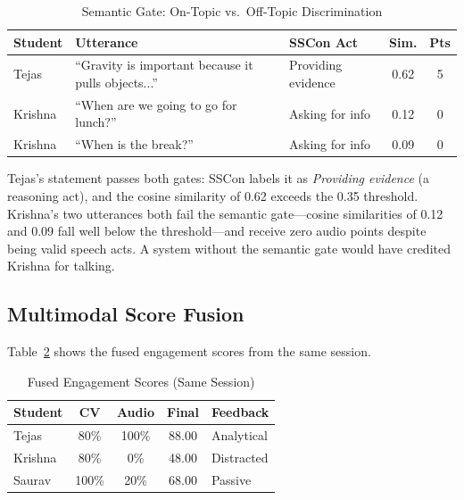 \documentclass[conference]{IEEEtran}
\begin{document}
\begin{table}[htbp]
\caption{Semantic Gate: On-Topic vs.\ Off-Topic Discrimination}
\begin{center}
\begin{tabular}{|p{0.9cm}|p{2.1cm}|p{1.5cm}|c|c|}
\hline
\textbf{Student} & \textbf{Utterance} & \textbf{SSCon Act} & \textbf{Sim.} & \textbf{Pts} \\
\hline
Tejas & ``Gravity is important because it pulls objects...'' & Providing evidence & 0.62 & 5 \\
\hline
Krishna & ``When are we going to go for lunch?'' & Asking for info & 0.12 & 0 \\
\hline
Krishna & ``When is the break?'' & Asking for info & 0.09 & 0 \\
\hline
\end{tabular}
\label{tab:gate_demo}
\end{center}
\end{table}

Tejas's statement passes both gates: SSCon labels it as \emph{Providing evidence} (a reasoning act), and the cosine similarity of 0.62 exceeds the 0.35 threshold. Krishna's two utterances both fail the semantic gate---cosine similarities of 0.12 and 0.09 fall well below the threshold---and receive zero audio points despite being valid speech acts. A system without the semantic gate would have credited Krishna for talking.

\subsection{Multimodal Score Fusion}
Table~\ref{tab:fused} shows the fused engagement scores from the same session.

\begin{table}[htbp]
\caption{Fused Engagement Scores (Same Session)}
\begin{center}
\begin{tabular}{|l|c|c|c|l|}
\hline
\textbf{Student} & \textbf{CV} & \textbf{Audio} & \textbf{Final} & \textbf{Feedback} \\
\hline
Tejas & 80\% & 100\% & 88.00 & Analytical \\
\hline
Krishna & 80\% & 0\% & 48.00 & Distracted \\
\hline
Saurav & 100\% & 20\% & 68.00 & Passive \\
\hline
\end{tabular}
\label{tab:fused}
\end{center}
\end{table}
\end{document}
